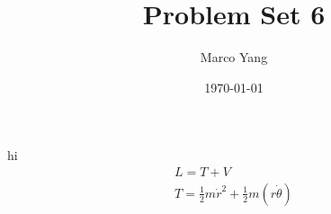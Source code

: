 \documentclass[answers]{exam}
\title{ Problem Set 6 }
\author{ Marco Yang }
\date{\today}
\begin{document}
\maketitle	

\question hi
\begin{align*}
L = T + V \\ 
T = \frac{1}{2} m \dot{r}^2 + \frac{1}{2} m (r\dot{\theta}) \\
\end{align*}
\end{document}
